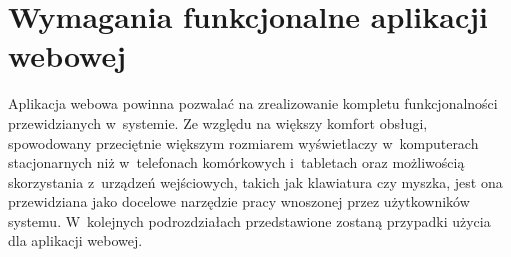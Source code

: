 \documentclass[11pt]{aghdpl}
\begin{document}
\section {Wymagania funkcjonalne aplikacji webowej}

Aplikacja webowa powinna pozwalać na zrealizowanie kompletu funkcjonalności przewidzianych w~systemie. Ze względu na większy komfort obsługi, spowodowany przeciętnie większym rozmiarem wyświetlaczy w~komputerach stacjonarnych niż w~telefonach komórkowych i~tabletach oraz możliwością skorzystania z~urządzeń wejściowych, takich jak klawiatura czy myszka, jest ona przewidziana jako docelowe narzędzie pracy wnoszonej przez użytkowników systemu. W~kolejnych podrozdziałach przedstawione zostaną przypadki użycia dla aplikacji webowej.

\def\useCaseNazwa{Funkcja}
\def\useCaseUzytkownik{Zarejestrowany użytkownik (lekarz)}
\def\useCaseAktor{Aktor}
\def\useCaseWarPocz{Warunki początkowe}
\def\useCaseScenAlt{Scenariusz alternatywny}
\def\useCaseScenBaz{Przebieg interakcji}
\def\useCaseWarKonc{Warunki końcowe}
\def\useCaseWyjatek{Wyjątek}
\def\useCaseZdarzInicj{Zdarzenie inicjujące}
\def\useCaseEnd{Scenariusz jest przerywany.}

%
%
\newcommand{\useCaseContinue}[1]{Scenariusz jest kontynuowany od punktu #1.}
\end{document}
